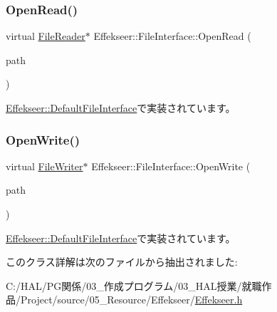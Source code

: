 \subsubsection{\texorpdfstring{Open\+Read()}{OpenRead()}}
{\footnotesize\ttfamily virtual \mbox{\hyperlink{class_effekseer_1_1_file_reader}{File\+Reader}}$\ast$ Effekseer\+::\+File\+Interface\+::\+Open\+Read (\begin{DoxyParamCaption}\item[{const \mbox{\hyperlink{_effekseer_8h_aca7eb5de6dd019c19ac58ea35a193f2f}{E\+F\+K\+\_\+\+C\+H\+AR}} $\ast$}]{path }\end{DoxyParamCaption})\hspace{0.3cm}{\ttfamily [pure virtual]}}



\mbox{\hyperlink{class_effekseer_1_1_default_file_interface_a03d6224d1eb0124a21f42c578e447d51}{Effekseer\+::\+Default\+File\+Interface}}で実装されています。

\mbox{\label{class_effekseer_1_1_file_interface_a1e60cb81a5cae39b37e44570ef693d91}} 
\subsubsection{\texorpdfstring{Open\+Write()}{OpenWrite()}}
{\footnotesize\ttfamily virtual \mbox{\hyperlink{class_effekseer_1_1_file_writer}{File\+Writer}}$\ast$ Effekseer\+::\+File\+Interface\+::\+Open\+Write (\begin{DoxyParamCaption}\item[{const \mbox{\hyperlink{_effekseer_8h_aca7eb5de6dd019c19ac58ea35a193f2f}{E\+F\+K\+\_\+\+C\+H\+AR}} $\ast$}]{path }\end{DoxyParamCaption})\hspace{0.3cm}{\ttfamily [pure virtual]}}



\mbox{\hyperlink{class_effekseer_1_1_default_file_interface_aecbcd4350ca701360dcea88a2c5f9c64}{Effekseer\+::\+Default\+File\+Interface}}で実装されています。



このクラス詳解は次のファイルから抽出されました\+:\begin{DoxyCompactItemize}
\item 
C\+:/\+H\+A\+L/\+P\+G関係/03\+\_\+作成プログラム/03\+\_\+\+H\+A\+L授業/就職作品/\+Project/source/05\+\_\+\+Resource/\+Effekseer/\mbox{\hyperlink{_effekseer_8h}{Effekseer.\+h}}\end{DoxyCompactItemize}
